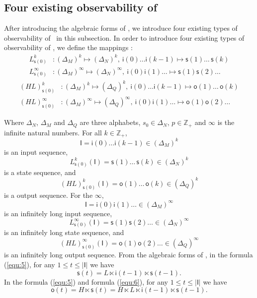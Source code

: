 

\subsection{Four existing observability of \BCNs}
After introducing the algebraic forms of \BCNs, we introduce four existing types of observability of \BCNs\ in this subsection. In order to introduce four existing types of observability of \BCNs, we define the mappings \cite{Zhang2016Observability}:
\begin{equation}
\begin{split}
L^k_{\mathsf{s}(0)} &: (\Delta_M)^k\mapsto(\Delta_N)^k,\ \mathsf{i}(0)\ldots \mathsf{i}({k-1}) \mapsto \mathsf{s}(1) \ldots\, \mathsf{s}(k)\\
L^{\infty}_{\mathsf{s}(0)} &: (\Delta_M)^{\infty}\mapsto(\Delta_N)^{\infty},\ \mathsf{i}(0) \mathsf{i}(1) \ldots  \mapsto \mathsf{s}(1) \mathsf{s}(2) \ldots
\end{split}
\label{equ:5}
\end{equation}
\begin{equation}
\begin{split}
(HL)^k_{\mathsf{s}(0)} &: (\Delta_M)^k\mapsto(\Delta_Q)^k,\ \mathsf{i}(0)\ldots \mathsf{i}(k-1) \mapsto \mathsf{o}(1)\ldots\, \mathsf{o}(k)\\
(HL)^{\infty}_{\mathsf{s}(0)} &: (\Delta_M)^{\infty}\mapsto(\Delta_Q)^{\infty},\ \mathsf{i}(0) \mathsf{i}(1) \ldots  \mapsto \mathsf{o}(1) \mathsf{o}(2)\ldots
\end{split}
\label{equ:6}
\end{equation}

Where $\Delta_N$, $\Delta_M$ and $\Delta_Q$ are three alphabets, $s_0\in \Delta_N$, $p\in \mathbb{Z}_+$ and $\infty$ is the infinite natural numbers. For all  $k\in \mathbb{Z}_+$, 
\[\mathsf{I}=\mathsf{i}(0)\ldots \mathsf{i}({k-1}) \in(\Delta_M)^k\] 
is an input sequence, 
\[L^k_{\mathsf{s}(0)}(\mathsf{I})=\mathsf{s}(1) \ldots\, \mathsf{s}(k) \in(\Delta_N)^k\]
 is a state sequence, and 
 \[(HL)^k_{\mathsf{s}(0)}(\mathsf{I})=\mathsf{o}(1)\ldots\, \mathsf{o}(k) \in(\Delta_Q)^k\] 
 is a output sequence. For the $\infty$, 
 \[\mathsf{I}=\mathsf{i}(0) \mathsf{i}(1)\ldots  \in(\Delta_M)^{\infty}\] 
 is an infinitely long input sequence, 
 \[L^{\infty}_{\mathsf{s}(0)}(\mathsf{I})=\mathsf{s}(1) \mathsf{s}(2)\ldots  \in(\Delta_N)^{\infty}\] 
 is an infinitely long state sequence, and 
 \[(HL)^{\infty}_{\mathsf{s}(0)}(\mathsf{I})=\mathsf{o}(1) \mathsf{o}(2)\ldots \in(\Delta_Q)^{\infty}\]
  is an infinitely long output sequence. From the algebraic forms of \BCNs, in the formula (\ref{equ:5}), for any $1\le t \le |\mathsf{I}|$ we have 
 \[\mathsf{s}(t)=L\ltimes\mathsf{i}({t-1})\ltimes\mathsf{s}({t-1}).\] 
 In the formula (\ref{equ:5}) and formula (\ref{equ:6}), for any $1\le t \le |\mathsf{I}|$ we have  
 \[\mathsf{o}(t)=H\ltimes\mathsf{s}(t)=H\ltimes L\ltimes\mathsf{i}({t-1})\ltimes\mathsf{s}({t-1}).\] 

